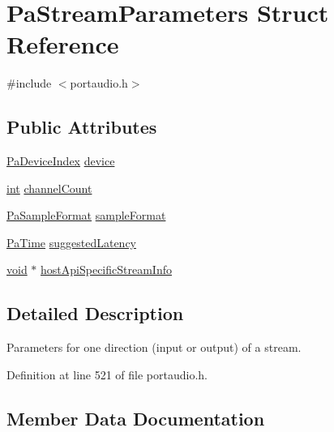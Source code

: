 \hypertarget{struct_pa_stream_parameters}{}\section{Pa\+Stream\+Parameters Struct Reference}
\label{struct_pa_stream_parameters}


{\ttfamily \#include $<$portaudio.\+h$>$}

\subsection*{Public Attributes}
\begin{DoxyCompactItemize}
\item 
\hyperlink{portaudio_8h_ad79317e65bde63d76c4b8e711ac5a361}{Pa\+Device\+Index} \hyperlink{struct_pa_stream_parameters_aebaf648b4d11dd1252a747b76b8da084}{device}
\item 
\hyperlink{xmltok_8h_a5a0d4a5641ce434f1d23533f2b2e6653}{int} \hyperlink{struct_pa_stream_parameters_a861ff361da71fc2572dd356c9c9878ca}{channel\+Count}
\item 
\hyperlink{portaudio_8h_a4582d93c2c2e60e12be3d74c5fe00b96}{Pa\+Sample\+Format} \hyperlink{struct_pa_stream_parameters_ad8d2d3063757b812f9e5f8709f41052b}{sample\+Format}
\item 
\hyperlink{portaudio_8h_af17a7e6d0471a23071acf8dbd7bbe4bd}{Pa\+Time} \hyperlink{struct_pa_stream_parameters_aa1e80ac0551162fd091db8936ccbe9a0}{suggested\+Latency}
\item 
\hyperlink{sound_8c_ae35f5844602719cf66324f4de2a658b3}{void} $\ast$ \hyperlink{struct_pa_stream_parameters_aff01b9fa0710ad1654471e97665c06a9}{host\+Api\+Specific\+Stream\+Info}
\end{DoxyCompactItemize}


\subsection{Detailed Description}
Parameters for one direction (input or output) of a stream. 

Definition at line 521 of file portaudio.\+h.



\subsection{Member Data Documentation}
